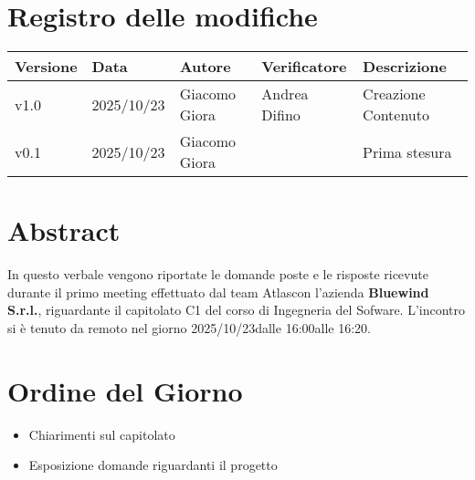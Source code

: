 \documentclass[a4paper,12pt]{article}
\newcommand{\Gruppo}{Atlas}
\newcommand{\DataVerbale}{2025/10/23}
\newcommand{\OraInizio}{16:00}
\newcommand{\OraFine}{16:20}
\newcommand{\AbstractVerbale}{%
In questo verbale vengono riportate le domande poste e le risposte ricevute durante il primo meeting effettuato dal team \Gruppo \space con l'azienda \textbf{Bluewind S.r.l.}, riguardante il capitolato C1 del corso di Ingegneria del Sofware. L'incontro si è tenuto da remoto nel giorno \DataVerbale \space dalle \OraInizio \space alle \OraFine.
}
\newcommand{\VersioneVerbale}{v1.0} %
\begin{document}
\section*{Registro delle modifiche}{
    \begin{center} 
        \begin{tabular}{|l|l|l|l|l|}
            \hline
            \textbf{Versione} & \textbf{Data} & \textbf{Autore} & \textbf{Verificatore} & \textbf{Descrizione} \\
            \hline
            \VersioneVerbale & 2025/10/23 & Giacomo Giora & Andrea Difino & Creazione Contenuto\\ 
            \hline
            v0.1 & 2025/10/23 & Giacomo Giora &  & Prima stesura\\ 
            \hline
       \end{tabular}
    \end{center}
}

\newpage

\tableofcontents

\newpage
\section{Abstract}{
    \begin{minipage}{0.9\textwidth}
        \small
        \AbstractVerbale
    \end{minipage}
}


\section{Ordine del Giorno}{
    \begin{itemize}
        \item Chiarimenti sul capitolato
        \item Esposizione domande riguardanti il progetto
    \end{itemize}
}
\end{document}
